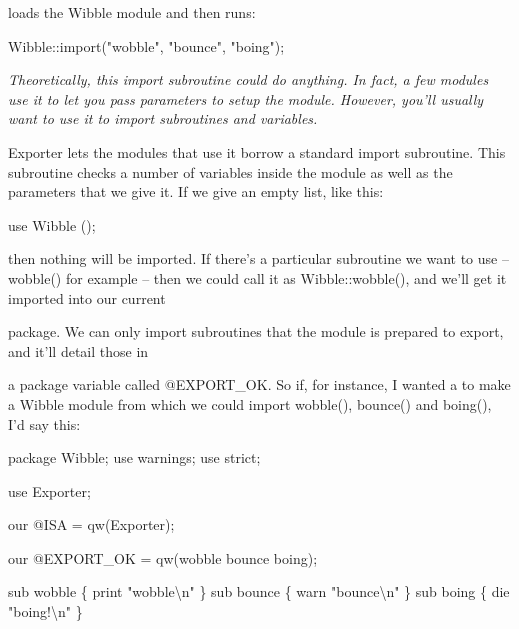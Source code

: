 \documentclass[a4paper,11pt]{book}
\begin{document}
\noindent loads the Wibble module and then runs:

\noindent 

\noindent 

\noindent Wibble::import("wobble", "bounce", "boing");

\noindent 

\noindent 

\noindent \textit{Theoretically, this import subroutine could do anything. In fact, a few modules use it to let you pass parameters to setup the module. However, you'll usually want to use it to import subroutines and variables.}

\noindent 

\noindent 

\noindent Exporter lets the modules that use it borrow a standard import subroutine. This subroutine checks a number of variables inside the module as well as the parameters that we give it. If we give an empty list, like this:

\noindent 

\noindent 

\noindent use Wibble ();

\noindent 

\noindent then nothing will be imported. If there's a particular subroutine we want to use -- wobble() for example -- then we could call it as Wibble::wobble(), and we'll get it imported into our current

\noindent package. We can only import subroutines that the module is prepared to export, and it'll detail those in

\noindent a package variable called @EXPORT\_OK. So if, for instance, I wanted a to make a Wibble module from which we could import wobble(), bounce() and boing(), I'd say this:

\noindent 

\noindent 

\noindent package Wibble; use warnings; use strict;

\noindent 

\noindent 

\noindent use Exporter;

\noindent our @ISA = qw(Exporter);

\noindent our @EXPORT\_OK = qw(wobble bounce boing);

\noindent 

\noindent sub wobble \{ print "wobble\textbackslash n" \} sub bounce \{ warn  "bounce\textbackslash n" \} sub boing  \{ die "boing!\textbackslash n" \}
\end{document}
